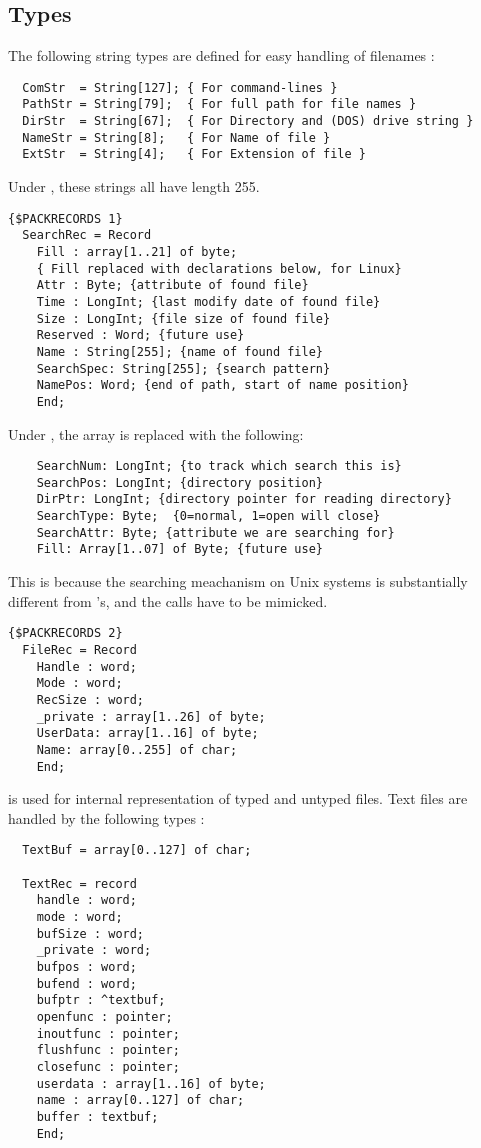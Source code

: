 \subsection{Types}
The following string types are defined for easy handling of
filenames :
\begin{verbatim}
  ComStr  = String[127]; { For command-lines } 
  PathStr = String[79];  { For full path for file names }
  DirStr  = String[67];  { For Directory and (DOS) drive string }
  NameStr = String[8];   { For Name of file }
  ExtStr  = String[4];   { For Extension of file }
\end{verbatim}
Under \linux, these strings all have length 255.
\begin{verbatim}
{$PACKRECORDS 1}
  SearchRec = Record
    Fill : array[1..21] of byte;  
    { Fill replaced with declarations below, for Linux}
    Attr : Byte; {attribute of found file}
    Time : LongInt; {last modify date of found file}
    Size : LongInt; {file size of found file}
    Reserved : Word; {future use}
    Name : String[255]; {name of found file}
    SearchSpec: String[255]; {search pattern}
    NamePos: Word; {end of path, start of name position}
    End;
\end{verbatim}
Under \linux, the  array is replaced with the following:
\begin{verbatim}
    SearchNum: LongInt; {to track which search this is}
    SearchPos: LongInt; {directory position}
    DirPtr: LongInt; {directory pointer for reading directory}
    SearchType: Byte;  {0=normal, 1=open will close}
    SearchAttr: Byte; {attribute we are searching for}
    Fill: Array[1..07] of Byte; {future use}
\end{verbatim}
This is because the searching meachanism on Unix systems is substantially
different from \dos's, and the calls have to be mimicked.
\begin{verbatim}
{$PACKRECORDS 2}
  FileRec = Record
    Handle : word;
    Mode : word;
    RecSize : word;
    _private : array[1..26] of byte;
    UserData: array[1..16] of byte;
    Name: array[0..255] of char;
    End;
\end{verbatim}
 is used for internal representation of typed and untyped files.
Text files are handled by the following types :
\begin{verbatim}
  TextBuf = array[0..127] of char;

  TextRec = record
    handle : word;
    mode : word;
    bufSize : word;
    _private : word;
    bufpos : word;
    bufend : word;
    bufptr : ^textbuf;
    openfunc : pointer;
    inoutfunc : pointer;
    flushfunc : pointer;
    closefunc : pointer;
    userdata : array[1..16] of byte;
    name : array[0..127] of char;
    buffer : textbuf;
    End;
\end{verbatim}
